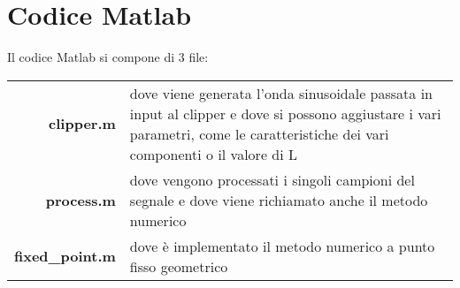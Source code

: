 \chapter{Codice Matlab}
	\label{code:matlab}
	Il codice Matlab si compone di 3 file:
	
	\noindent\hspace{5px}\begin{tabularx}{\textwidth}{r X}
		\textbf{clipper.m}			&dove viene generata l'onda sinusoidale passata in input al clipper e dove si possono aggiustare i vari parametri, come le caratteristiche dei vari componenti o il valore di L\\
		\textbf{process.m}			&dove vengono processati i singoli campioni del segnale e dove viene richiamato anche il metodo numerico\\
		\textbf{fixed\_point.m}		&dove è implementato il metodo numerico a punto fisso geometrico 
	\end{tabularx}\\
	
